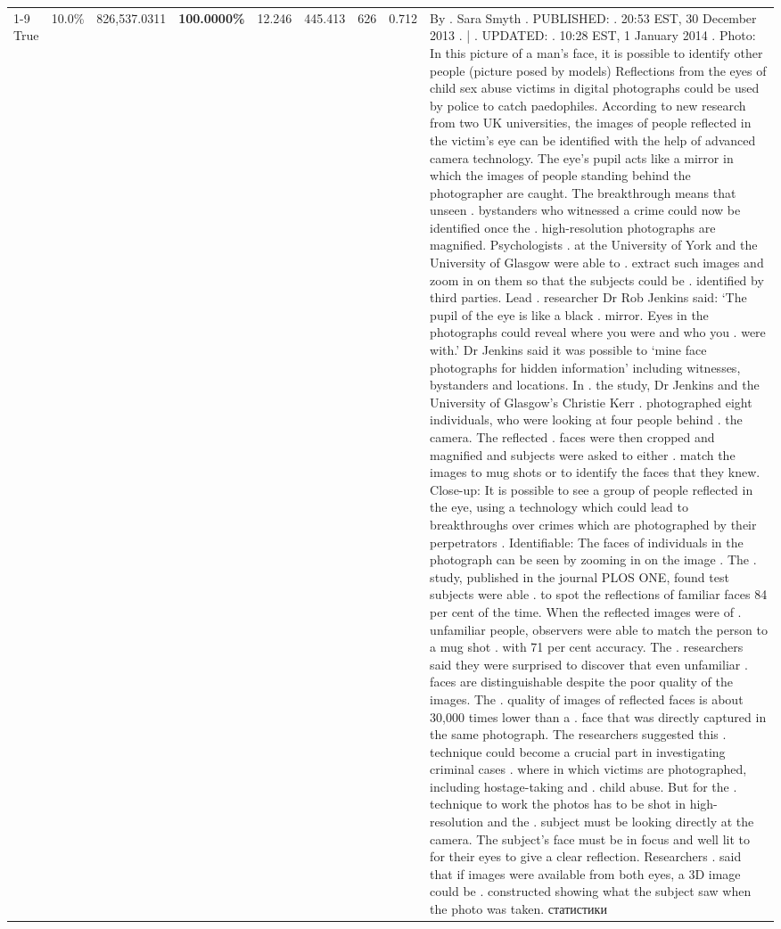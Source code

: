 \begin{table}[H]
\begin{tabular}{lllrlllll}
\cline{1-9}
True & 10.0\% & 826,537.0311 & \bfseries \color{red} 100.0000\% & 12.246 & 445.413 & 626 & 0.712 & By . Sara Smyth . PUBLISHED: . 20:53 EST, 30 December 2013 . | . UPDATED: . 10:28 EST, 1 January 2014 . Photo: In this picture of a man's face, it is possible to identify other people (picture posed by models) Reflections from the eyes of child sex abuse victims in digital photographs could be used by police to catch paedophiles. According to new research from two UK universities, the images of people reflected in the victim's eye can be identified with the help of advanced camera technology. The eye's pupil acts like a mirror in which the images of people standing behind the photographer are caught. The breakthrough means that unseen . bystanders who witnessed a crime could now be identified once the . high-resolution photographs are magnified. Psychologists . at the University of York and the University of Glasgow were able to . extract such images and zoom in on them so that the subjects could be . identified by third parties. Lead . researcher Dr Rob Jenkins said: ‘The pupil of the eye is like a black . mirror. Eyes in the photographs could reveal where you were and who you . were with.' Dr Jenkins said it was possible to ‘mine face photographs for hidden information' including witnesses, bystanders and locations. In . the study, Dr Jenkins and the University of Glasgow's Christie Kerr . photographed eight individuals, who were looking at four people behind . the camera. The reflected . faces were then cropped and magnified and subjects were asked to either . match the images to mug shots or to identify the faces that they knew. Close-up: It is possible to see a group of people reflected in the eye, using a technology which could lead to breakthroughs over crimes which are photographed by their perpetrators . Identifiable: The faces of individuals in the photograph can be seen by zooming in on the image . The . study, published in the journal PLOS ONE, found test subjects were able . to spot the reflections of familiar faces 84 per cent of the time. When the reflected images were of . unfamiliar people, observers were able to match the person to a mug shot . with 71 per cent accuracy. The . researchers said they were surprised to discover that even unfamiliar . faces are distinguishable despite the poor quality of the images. The . quality of images of reflected faces is about 30,000 times lower than a . face that was directly captured in the same photograph. The researchers suggested this . technique could become a crucial part in investigating criminal cases . where in which victims are photographed, including hostage-taking and . child abuse. But for the . technique to work the photos has to be shot in high-resolution and the . subject must be looking directly at the camera. The subject's face must be in focus and well lit to for their eyes to give a clear reflection. Researchers . said that if images were available from both eyes, a 3D image could be . constructed showing what the subject saw when the photo was taken. статистики \\

\end{tabular}
\end{table}
